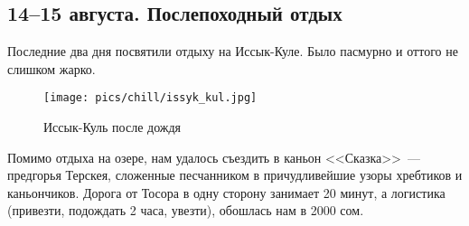 \subsection{14--15 августа. Послепоходный отдых}

Последние два дня посвятили отдыху на Иссык-Куле. Было пасмурно и оттого не слишком жарко.

\begin{figure}[h!]
	\centering
	\texttt{[image: pics/chill/issyk\_kul.jpg]}
	\caption{Иссык-Куль после дождя}
	\label{fig:issyk_kul.jpg}
\end{figure}

Помимо отдыха на озере, нам удалось съездить в каньон <<Сказка>>~--- предгорья Терскея, сложенные песчанником в причудливейшие узоры хребтиков и каньончиков. Дорога от Тосора в одну сторону занимает 20 минут, а логистика (привезти, подождать 2 часа, увезти), обошлась нам в 2000 сом.